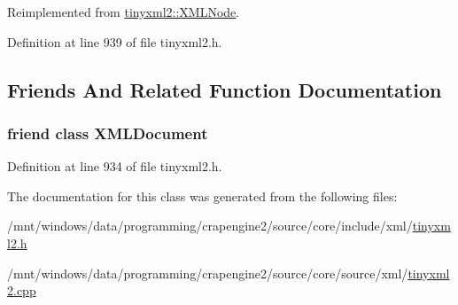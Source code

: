 Reimplemented from \hyperlink{classtinyxml2_1_1_x_m_l_node_a157ce3a00ea5ee5a85b7103138e85e8a}{tinyxml2\+::\+X\+M\+L\+Node}.



Definition at line 939 of file tinyxml2.\+h.



\subsection{Friends And Related Function Documentation}
\hypertarget{classtinyxml2_1_1_x_m_l_comment_a4eee3bda60c60a30e4e8cd4ea91c4c6e}{}
\subsubsection[{X\+M\+L\+Document}]{\setlength{\rightskip}{0pt plus 5cm}friend class {\bf X\+M\+L\+Document}\hspace{0.3cm}{\ttfamily [friend]}}\label{classtinyxml2_1_1_x_m_l_comment_a4eee3bda60c60a30e4e8cd4ea91c4c6e}


Definition at line 934 of file tinyxml2.\+h.



The documentation for this class was generated from the following files\+:\begin{DoxyCompactItemize}
\item 
/mnt/windows/data/programming/crapengine2/source/core/include/xml/\hyperlink{tinyxml2_8h}{tinyxml2.\+h}\item 
/mnt/windows/data/programming/crapengine2/source/core/source/xml/\hyperlink{tinyxml2_8cpp}{tinyxml2.\+cpp}\end{DoxyCompactItemize}
